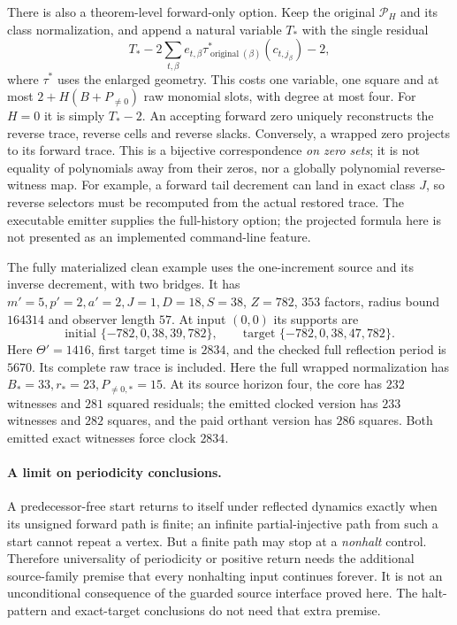 There is also a theorem-level forward-only option. Keep the original
$\mathcal P_H$ and its class normalization, and append a natural variable
$T_*$ with the single residual
\[
 T_*-2\sum_{t,\beta}e_{t,\beta}
       \tau^*_{\operatorname{original}(\beta)}(c_{t,j_\beta})-2,
\]
where $\tau^*$ uses the enlarged geometry. This costs one variable, one
square and at most $2+H(B+P_{\ne0})$ raw monomial slots, with degree at most
four. For $H=0$ it is simply $T_*-2$. An accepting forward zero uniquely
reconstructs the reverse trace, reverse cells and reverse slacks. Conversely,
a wrapped zero projects to its forward trace. This is a bijective
correspondence \emph{on zero sets}; it is not equality of polynomials away
from their zeros, nor a globally polynomial reverse-witness map. For example,
a forward tail decrement can land in exact class $J$, so reverse selectors
must be recomputed from the actual restored trace. The executable emitter
supplies the full-history option; the projected formula here is not presented
as an implemented command-line feature.

The fully materialized clean example uses the one-increment source and its
inverse decrement, with two bridges. It has $m'=5,p'=2,a'=2,J=1,D=18,S=38$,
$Z=782$, $353$ factors, radius bound $164314$ and observer length $57$.
At input $(0,0)$ its supports are
\[
 \text{initial }\{-782,0,38,39,782\},\qquad
 \text{target }\{-782,0,38,47,782\}.
\]
Here $\Theta'=1416$, first target time is $2834$, and the checked full
reflection period is $5670$. Its complete raw trace is included.
Here the full wrapped normalization has $B_*=33,r_*=23,P_{\ne0,*}=15$.
At its source horizon four, the core has $232$ witnesses and $281$ squared
residuals; the emitted clocked version has $233$ witnesses and $282$ squares,
and the paid orthant version has $286$ squares. Both emitted exact witnesses
force clock $2834$.

\paragraph{A limit on periodicity conclusions.}
A predecessor-free start returns to itself under reflected dynamics exactly
when its unsigned forward path is finite; an infinite partial-injective path
from such a start cannot repeat a vertex. But a finite path may stop at a
\emph{nonhalt} control. Therefore universality of periodicity or positive
return needs the additional source-family premise that every nonhalting input
continues forever. It is not an unconditional consequence of the guarded
source interface proved here. The halt-pattern and exact-target conclusions
do not need that extra premise.
